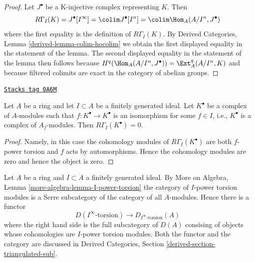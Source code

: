 \begin{proof}
Let $J^\bullet$ be a K-injective complex representing $K$. Then
$$
R\Gamma_I(K) = J^\bullet[I^\infty] = \colim J^\bullet[I^n] =
\colim \Hom_A(A/I^n, J^\bullet)
$$
where the first equality is the definition of $R\Gamma_I(K)$.
By Derived Categories, Lemma \ref{derived-lemma-colim-hocolim}
we obtain the first displayed equality in the statement of the lemma.
The second displayed equality in the statement of the lemma then
follows because $H^q(\Hom_A(A/I^n, J^\bullet)) = \Ext^q_A(A/I^n, K)$
and because filtered colimits are exact in the category of abelian
groups.
\end{proof}

\begin{lemma}
\label{dualizing-lemma-bad-local-cohomology-vanishes}
\href{https://stacks.math.columbia.edu/tag/0A6M}{\texttt{Stacks tag 0A6M}}

Let $A$ be a ring and let $I \subset A$ be a finitely generated ideal.
Let $K^\bullet$ be a complex of $A$-modules such that
$f : K^\bullet \to K^\bullet$ is an isomorphism for some
$f \in I$, i.e., $K^\bullet$ is a complex of $A_f$-modules. Then
$R\Gamma_I(K^\bullet) = 0$.
\end{lemma}

\begin{proof}
Namely, in this case the cohomology modules of $R\Gamma_I(K^\bullet)$
are both $f$-power torsion and $f$ acts by automorphisms. Hence the
cohomology modules are zero and hence the object is zero.
\end{proof}

Let $A$ be a ring and $I \subset A$ a finitely generated ideal.
By More on Algebra, Lemma \ref{more-algebra-lemma-I-power-torsion}
the category of $I$-power torsion modules is a Serre subcategory
of the category of all $A$-modules. Hence there is a functor
\begin{equation}
\label{equation-compare-torsion}
D(I^\infty\text{-torsion}) \longrightarrow D_{I^\infty\text{-torsion}}(A)
\end{equation}
where the right hand side is the full subcategory of $D(A)$
consising of objects whose cohomologies are $I$-power torsion modules.
Both the functor and the category are discussed in
Derived Categories, Section \ref{derived-section-triangulated-sub}.

